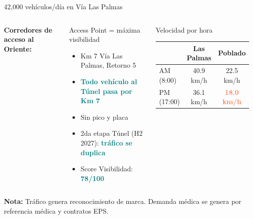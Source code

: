 \documentclass[aspectratio=169, 11pt]{beamer}
\newcommand{\highlight}[1]{\textcolor{teal}{\textbf{#1}}}
\newcommand{\danger}[1]{\textcolor{coral}{\textbf{#1}}}
\newcommand{\src}[1]{\par\vspace{2pt}{\tiny\textcolor{slate}{Fuente: #1}}}
\begin{document}
\begin{frame}{42,000 vehículos/día en Vía Las Palmas}
\begin{columns}[T]
{\scriptsize\textbf{Corredores de acceso al Oriente:}}

\vspace{2pt}
\src{MEData Aforos (b9s9-jw7c), 64,285 obs.}

\begin{exampleblock}{\small Access Point = máxima visibilidad}
\scriptsize
\begin{itemize}\setlength{\itemsep}{1pt}
  \item Km 7 Vía Las Palmas, Retorno 5
  \item \highlight{Todo vehículo al Túnel pasa por Km 7}
  \item Sin pico y placa
  \item 2da etapa Túnel (H2 2027): \highlight{tráfico se duplica}
  \item Score Visibilidad: \highlight{78/100}
\end{itemize}
\end{exampleblock}

\vspace{2pt}
\begin{block}{\small Velocidad por hora}
\scriptsize
\begin{tabular}{@{}lcc@{}}
\toprule
& Las Palmas & Poblado \\
\midrule
AM (8:00) & 40.9 km/h & 22.5 km/h \\
\rowcolor{coral!8}
PM (17:00) & 36.1 km/h & \danger{18.0 km/h} \\
\bottomrule
\end{tabular}
\end{block}
\end{columns}
\vspace{1pt}
{\tiny\textcolor{amber!80!black}{\textbf{Nota:}} Tráfico genera reconocimiento de marca. Demanda médica se genera por referencia médica y contratos EPS.}
\end{frame}
\end{document}
